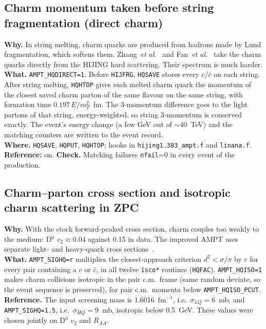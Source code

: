 \documentclass[11pt,a4paper]{article}
\newcommand{\sw}[1]{\texttt{#1}}
\newcommand{\code}[1]{\texttt{#1}}
\begin{document}
\subsection{Charm momentum taken before string fragmentation (direct charm)}
\textbf{Why.} In string melting, charm quarks are produced from hadrons made by Lund fragmentation, which softens
them. Zhang~\emph{et al.}~\cite{zhang2023,zhang2024} and Fan~\emph{et al.}~\cite{fan2026} take the charm quarks directly
from the HIJING hard scattering. Their spectrum is much harder.\\
\textbf{What.} \sw{AMPT\_HQDIRECT=1}. Before \code{HIJFRG}, \code{HQSAVE} stores every $c/\bar c$ on each string. After
string melting, \code{HQHTOP} gives each melted charm quark the momentum of the closest saved charm parton of the same
flavour on the same string, with formation time $0.197\,E/m_T^2$~fm. The 3-momentum difference goes to the light
partons of that string, energy-weighted, so string 3-momentum is conserved exactly. The event's energy change (a few
GeV out of $\sim40$~TeV) and the matching counters are written to the event record.\\
\textbf{Where.} \code{HQSAVE}, \code{HQPUT}, \code{HQHTOP}; hooks in \code{hijing1.383\_ampt.f} and \code{linana.f}.
\textbf{Reference:} on. \textbf{Check.} Matching failures \code{nfail}=0 in every event of the production.

\subsection{Charm--parton cross section and isotropic charm scattering in ZPC}
\textbf{Why.} With the stock forward-peaked cross section, charm couples too weakly to the medium: D$^0$ $v_2\approx0.04$
against 0.15 in data. The improved AMPT uses separate light- and heavy-quark cross sections~\cite{zhang2024}.\\
\textbf{What.} \sw{AMPT\_SIGHQ=r} multiplies the closest-approach criterion $d^2<\sigma/\pi$ by $r$ for every pair
containing a $c$ or $\bar c$, in all twelve \code{isco*} routines (\code{HQFAC}). \sw{AMPT\_HQISO=1} makes charm
collisions isotropic in the pair c.m.\ frame (same random deviate, so the event sequence is preserved), for pair c.m.\
momenta below \sw{AMPT\_HQISO\_PCUT}.\\
\textbf{Reference.} The input screening mass is 1.6016~fm$^{-1}$, i.e.\ $\sigma_{LQ}=6$~mb, and \sw{AMPT\_SIGHQ=1.5},
i.e.\ $\sigma_{HQ}=9$~mb, isotropic below 0.5~GeV. These values were chosen jointly on D$^0$ $v_2$ and $R_{AA}$.
\end{document}
